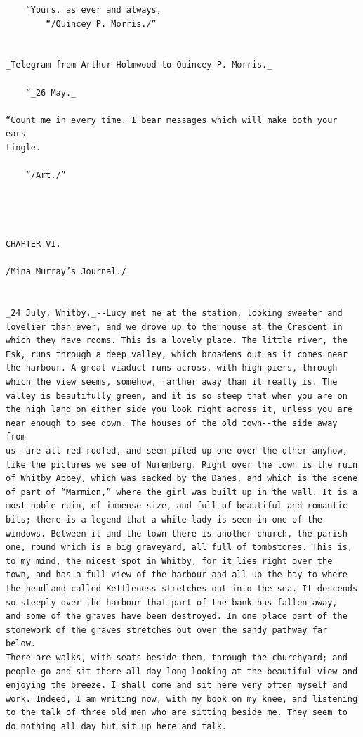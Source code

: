 \documentclass{article}
\begin{document}
\begin{verbatim}
    “Yours, as ever and always,
        “/Quincey P. Morris./”


_Telegram from Arthur Holmwood to Quincey P. Morris._

    “_26 May._

“Count me in every time. I bear messages which will make both your ears
tingle.

    “/Art./”




CHAPTER VI.

/Mina Murray’s Journal./


_24 July. Whitby._--Lucy met me at the station, looking sweeter and
lovelier than ever, and we drove up to the house at the Crescent in
which they have rooms. This is a lovely place. The little river, the
Esk, runs through a deep valley, which broadens out as it comes near
the harbour. A great viaduct runs across, with high piers, through
which the view seems, somehow, farther away than it really is. The
valley is beautifully green, and it is so steep that when you are on
the high land on either side you look right across it, unless you are
near enough to see down. The houses of the old town--the side away from
us--are all red-roofed, and seem piled up one over the other anyhow,
like the pictures we see of Nuremberg. Right over the town is the ruin
of Whitby Abbey, which was sacked by the Danes, and which is the scene
of part of “Marmion,” where the girl was built up in the wall. It is a
most noble ruin, of immense size, and full of beautiful and romantic
bits; there is a legend that a white lady is seen in one of the
windows. Between it and the town there is another church, the parish
one, round which is a big graveyard, all full of tombstones. This is,
to my mind, the nicest spot in Whitby, for it lies right over the
town, and has a full view of the harbour and all up the bay to where
the headland called Kettleness stretches out into the sea. It descends
so steeply over the harbour that part of the bank has fallen away,
and some of the graves have been destroyed. In one place part of the
stonework of the graves stretches out over the sandy pathway far below.
There are walks, with seats beside them, through the churchyard; and
people go and sit there all day long looking at the beautiful view and
enjoying the breeze. I shall come and sit here very often myself and
work. Indeed, I am writing now, with my book on my knee, and listening
to the talk of three old men who are sitting beside me. They seem to
do nothing all day but sit up here and talk.


\end{verbatim}
\end{document}
